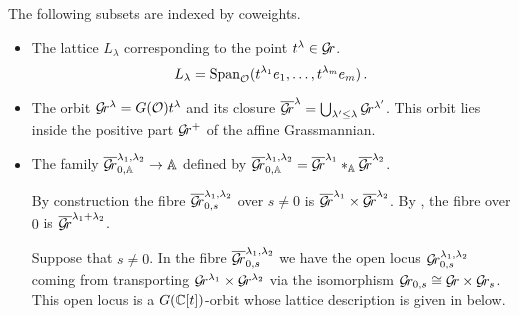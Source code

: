 \documentclass[draft]{article}
\begin{document}
The following subsets are indexed by coweights. 
% 
\begin{itemize}
    \item The lattice $L_\lambda$ corresponding to the point $t^\lambda\in\mathcal{G}\!r$. 
    $$ 
    L_\lambda = \operatorname{Span}_\mathcal O(t^{\lambda_1}e_1, \dots, t^{\lambda_m}e_m)\,. 
    $$ 
    \item The orbit $\mathcal{G}\!r^\lambda = G(\mathcal O) t^\lambda$ and its closure 
    $ \overline{\mathcal{G}\!r}^\lambda = \bigcup_{\lambda' \le \lambda} \mathcal{G}\!r^{\lambda'} $.  
    This orbit lies inside the positive part $ \mathcal{G}\!r^+$ of the affine Grassmannian.
    \item The family $ \overline{\mathcal{G}\!r}_{0,\mathbb A}^{\lambda_1, \lambda_2} \rightarrow \mathbb A$ defined by $ \overline{\mathcal{G}\!r}^{\lambda_1, \lambda_2}_{0, \mathbb A} = \overline{\mathcal{G}\!r}^{\lambda_1} \ast_\mathbb A \overline{\mathcal{G}\!r}^{\lambda_2}$. 
    
    By construction the fibre $ \overline{\mathcal{G}\!r}_{0,s}^{\lambda_1, \lambda_2} $ over $ s \ne 0 $ is $ \overline{\mathcal{G}\!r}^{\lambda_1} \times \overline{\mathcal{G}\!r}^{\lambda_2}$.  By \cite[Proposition 3.1.14]{zhu2016introduction},
    the fibre over $ 0 $ is $ \overline{\mathcal{G}\!r}^{\lambda_1 + \lambda_2}$.
    
    Suppose that $ s \ne 0$.  In the fibre $\overline{\mathcal{G}\!r}_{0,s}^{\lambda_1, \lambda_2}$ we have the open locus $ \mathcal{G}\!r_{0,s}^{\lambda_1, \lambda_2}$ coming from transporting $ \mathcal{G}\!r^{\lambda_1} \times \mathcal{G}\!r^{\lambda_2} $ via the isomorphism $ \mathcal{G}\!r_{0,s} \cong \mathcal{G}\!r \times \mathcal{G}\!r_s $.  This open locus is a $ G(\mathbb C[t])$-orbit
    whose lattice description is given in  below.
    

\end{itemize}
\end{document}
